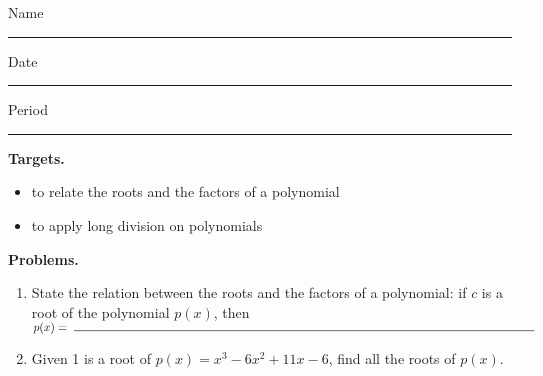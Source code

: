 \documentclass[10pt]{article}
\title{}
\date{}
\begin{document}
\noindent
{
Name \rule{16em}{.5pt} Date \rule{8em}{.5pt} Period \rule{4em}{.5pt}
}
\vspace{1em}

{\noindent\bf Targets.}
\begin{itemize}
    \item to relate the roots and the factors of a polynomial 
    \item to apply long division on polynomials
\end{itemize}

{\noindent\bf Problems.}

\begin{enumerate}
    \item State the relation between the roots and the factors of a polynomial: if $c$ is a root of the polynomial \(p(x)\), then\\[1em] \(\displaystyle p(x) =\ \rule{40em}{0.5pt}\)
    \item Given 1 is a root of \(p(x) = x^3 -6x^2 + 11x -6\), find all the roots of \(p(x)\).
\end{enumerate}
\end{document}
